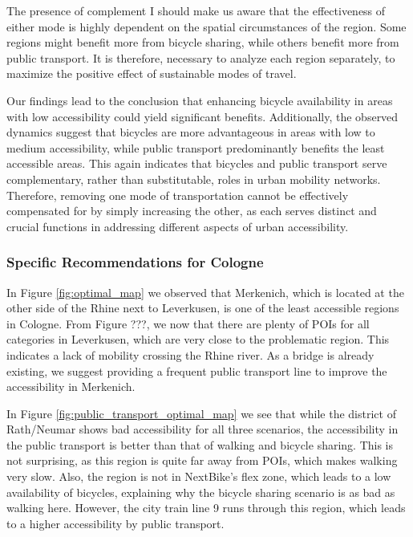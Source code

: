 The presence of complement I should make us aware that the effectiveness of either mode is highly dependent on the spatial circumstances of the region.
Some regions might benefit more from bicycle sharing, while others benefit more from public transport.
It is therefore, necessary to analyze each region separately, to maximize the positive effect of sustainable modes of travel.

Our findings lead to the conclusion that enhancing bicycle availability in areas with low accessibility could yield significant benefits.
Additionally, the observed dynamics suggest that bicycles are more advantageous in areas with low to medium accessibility, while public transport predominantly benefits the least accessible areas.
This again indicates that bicycles and public transport serve complementary, rather than substitutable, roles in urban mobility networks.
Therefore, removing one mode of transportation cannot be effectively compensated for by simply increasing the other, as each serves distinct and crucial functions in addressing different aspects of urban accessibility.


\subsubsection{Specific Recommendations for Cologne}

In Figure \ref{fig:optimal_map} we observed that Merkenich, which is located at the other side of the Rhine next to Leverkusen, is one of the least accessible regions in Cologne.
From Figure ???, we now that there are plenty of POIs for all categories in Leverkusen, which are very close to the problematic region.
This indicates a lack of mobility crossing the Rhine river.
As a bridge is already existing, we suggest providing a frequent public transport line to improve the accessibility in Merkenich.

In Figure \ref{fig:public_transport_optimal_map} we see that while the district of Rath/Neumar shows bad accessibility for all three scenarios, the accessibility in the public transport is better than that of walking and bicycle sharing.
This is not surprising, as this region is quite far away from POIs, which makes walking very slow.
Also, the region is not in NextBike's flex zone, which leads to a low availability of bicycles, explaining why the bicycle sharing scenario is as bad as walking here.
However, the city train line 9 runs through this region, which leads to a higher accessibility by public transport.


